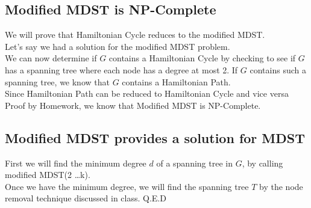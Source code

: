 \documentclass[10pt,twocolumn]{article}
\begin{document}
\subsection{Modified MDST is NP-Complete}
We will prove that Hamiltonian Cycle reduces to the modified MDST.\\
Let's say we had a solution for the modified MDST problem.\\
We can now determine if $G$ contains a Hamiltonian Cycle by checking to see if $G$ has a spanning tree where each node has a degree at most 2. If $G$ contains such a spanning tree, we know that $G$ contains a Hamiltonian Path.\\
Since Hamiltonian Path can be reduced to Hamiltonian Cycle and vice versa {Proof by Homework}, we know that Modified MDST is NP-Complete.
\subsection{Modified MDST provides a solution for MDST}
First we will find the minimum degree $d$ of a spanning tree in $G$, by calling modified MDST(2 \dots k).\\
Once we have the minimum degree, we will find the spanning tree $T$ by the node removal technique discussed in class.
Q.E.D
\end{document}

